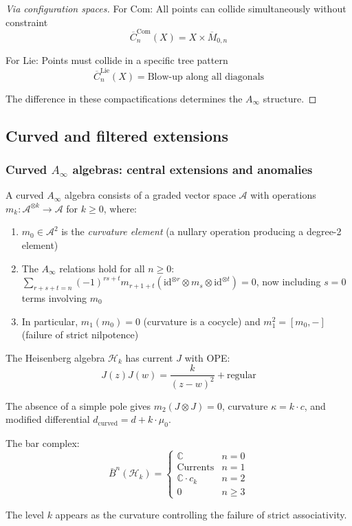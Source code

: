 \begin{proof}[Via configuration spaces]
For Com: All points can collide simultaneously without constraint
\[\overline{C}_n^{\text{Com}}(X) = X \times \overline{M}_{0,n}\]

For Lie: Points must collide in a specific tree pattern
\[\overline{C}_n^{\text{Lie}}(X) = \text{Blow-up along all diagonals}\]

The difference in these compactifications determines the $A_\infty$ structure.
\end{proof}


\subsection{Curved and filtered extensions}

\subsubsection{\texorpdfstring{Curved $A_\infty$ algebras: central extensions and anomalies}{Curved A-infinity algebras: central extensions and anomalies}}

\begin{definition}\label{def:curved-ainfty-hg}
A curved $A_\infty$ algebra consists of a graded vector space $\mathcal{A}$ with operations $m_k: \mathcal{A}^{\otimes k} \to \mathcal{A}$ for $k \geq 0$, where:
\begin{enumerate}
\item $m_0 \in \mathcal{A}^2$ is the \emph{curvature element} (a nullary operation producing a degree-2 element)
\item The $A_\infty$ relations hold for all $n \geq 0$: $\sum_{r+s+t=n} (-1)^{rs+t} m_{r+1+t}(\text{id}^{\otimes r} \otimes m_s \otimes \text{id}^{\otimes t}) = 0$, now including $s = 0$ terms involving $m_0$
\item In particular, $m_1(m_0) = 0$ (curvature is a cocycle) and $m_1^2 = [m_0, -]$ (failure of strict nilpotence)
\end{enumerate}
\end{definition}

\begin{example}
The Heisenberg algebra $\mathcal{H}_k$ has current $J$ with OPE:
\[J(z)J(w) = \frac{k}{(z-w)^2} + \text{regular}\]

The absence of a simple pole gives $m_2(J \otimes J) = 0$, curvature $\kappa = k \cdot c$, and modified differential $d_{\text{curved}} = d + k \cdot \mu_0$.

The bar complex:
\[\bar{B}^n(\mathcal{H}_k) = \begin{cases}
\mathbb{C} & n = 0 \\
\text{Currents} & n = 1 \\
\mathbb{C} \cdot c_k & n = 2 \\
0 & n \geq 3
\end{cases}\]

The level $k$ appears as the curvature controlling the failure of strict associativity.
\end{example}

